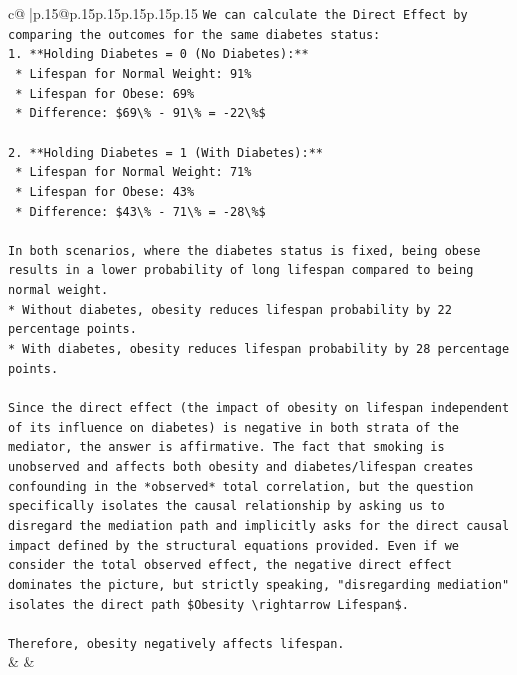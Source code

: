 \documentclass{article}
\begin{document}
{\begin{supertabular}{c@{$\;$}|p{.15\linewidth}@{}p{.15\linewidth}p{.15\linewidth}p{.15\linewidth}p{.15\linewidth}p{.15\linewidth}}
{{{\texttt{We can calculate the Direct Effect by comparing the outcomes for the same diabetes status:} \\
\texttt{1.  **Holding Diabetes = 0 (No Diabetes):**} \\
\texttt{    *   Lifespan for Normal Weight: 91\%} \\
\texttt{    *   Lifespan for Obese: 69\%} \\
\texttt{    *   Difference: \$69\textbackslash{}\% {-} 91\textbackslash{}\% = {-}22\textbackslash{}\%\$} \\
\\ 
\texttt{2.  **Holding Diabetes = 1 (With Diabetes):**} \\
\texttt{    *   Lifespan for Normal Weight: 71\%} \\
\texttt{    *   Lifespan for Obese: 43\%} \\
\texttt{    *   Difference: \$43\textbackslash{}\% {-} 71\textbackslash{}\% = {-}28\textbackslash{}\%\$} \\
\\ 
\texttt{In both scenarios, where the diabetes status is fixed, being obese results in a lower probability of long lifespan compared to being normal weight.} \\
\texttt{*   Without diabetes, obesity reduces lifespan probability by 22 percentage points.} \\
\texttt{*   With diabetes, obesity reduces lifespan probability by 28 percentage points.} \\
\\ 
\texttt{Since the direct effect (the impact of obesity on lifespan independent of its influence on diabetes) is negative in both strata of the mediator, the answer is affirmative. The fact that smoking is unobserved and affects both obesity and diabetes/lifespan creates confounding in the *observed* total correlation, but the question specifically isolates the causal relationship by asking us to disregard the mediation path and implicitly asks for the direct causal impact defined by the structural equations provided. Even if we consider the total observed effect, the negative direct effect dominates the picture, but strictly speaking, "disregarding mediation" isolates the direct path \$Obesity \textbackslash{}rightarrow Lifespan\$.} \\
\\ 
\texttt{Therefore, obesity negatively affects lifespan.} \\
            }
        }
    }
    & & \\ \\


\end{supertabular}}
\end{document}

